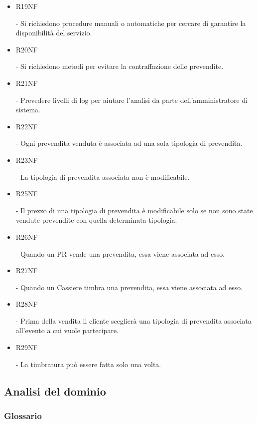 \documentclass[a4paper]{article}
\begin{document}
\begin{itemize}
	\item \hypertarget{R19NF}{R19NF} - Si richiedono procedure manuali o automatiche per cercare di garantire la disponibilità del servizio.
	
	\item \hypertarget{R20NF}{R20NF} - Si richiedono metodi per evitare la contraffazione delle prevendite.
	
	\item \hypertarget{R21NF}{R21NF} - Prevedere livelli di log per aiutare l'analisi da parte dell'amministratore di sistema.
	
	\item \hypertarget{R22NF}{R22NF} - Ogni prevendita venduta è associata ad una sola tipologia di prevendita.
	\item \hypertarget{R23NF}{R23NF} - La tipologia di prevendita associata non è modificabile.
	
	\item \hypertarget{R25NF}{R25NF} - Il prezzo di una tipologia di prevendita è modificabile solo se non sono state vendute prevendite con quella determinata tipologia.
	
	\item \hypertarget{R26NF}{R26NF} - Quando un PR vende una prevendita, essa viene associata ad esso.
	\item \hypertarget{R27NF}{R27NF} - Quando un Cassiere timbra una prevendita, essa viene associata ad esso.
	
	\item \hypertarget{R6NF}{R28NF} - Prima della vendita il cliente sceglierà una tipologia di prevendita associata all'evento a cui vuole partecipare.
	
	\item \hypertarget{R29NF}{R29NF} - La timbratura può essere fatta solo una volta.
	
	
\end{itemize}

\newpage

\subsection{Analisi del dominio}

\subsubsection{Glossario}
\end{document}
